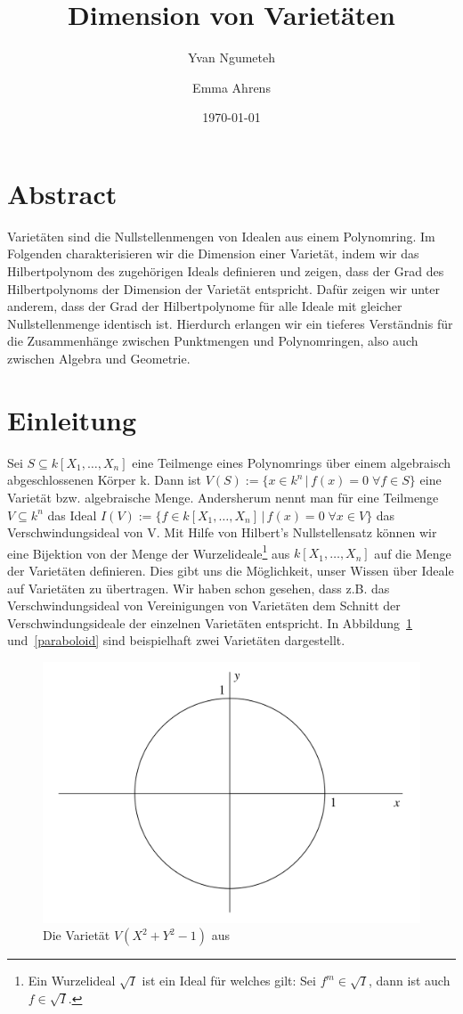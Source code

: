 \documentclass{article}
\title{Dimension von Varietäten}
\date{\today}
\author{Yvan Ngumeteh \and Emma Ahrens}
\newcommand*{\R}{k[X_{1},\ldots,X_{n}]}
\begin{document}
\maketitle

\section{Abstract}
	
	Varietäten sind die Nullstellenmengen von Idealen aus einem Polynomring. Im Folgenden 
	charakterisieren wir
	die Dimension einer Varietät, indem wir das Hilbertpolynom des zugehörigen Ideals
	definieren und zeigen, dass der Grad des Hilbertpolynoms der Dimension der Varietät entspricht.
	Dafür zeigen wir unter anderem, dass der Grad der Hilbertpolynome für alle Ideale mit 
	gleicher Nullstellenmenge identisch ist.
	Hierdurch erlangen wir ein tieferes Verständnis für die Zusammenhänge zwischen Punktmengen und
	Polynomringen, also auch zwischen Algebra und Geometrie.
	
\section{Einleitung}
	
	Sei \(S \subseteq \R\) eine Teilmenge eines Polynomrings über einem algebraisch abgeschlossenen
	Körper k. Dann ist \(V(S) := \{x \in k^n\,|\, f(x)=0\; \forall f \in S\}\) eine Varietät bzw.
	algebraische Menge. Andersherum nennt man für eine Teilmenge \(V \subseteq k^{n}\) das 
	Ideal \(I(V) := \{f \in \R\,|\, f(x)=0\; \forall x\in V\}\) das Verschwindungsideal von V.
	Mit Hilfe von Hilbert's Nullstellensatz können wir eine Bijektion von
	der Menge der Wurzelideale\footnote{Ein Wurzelideal \(\sqrt{I}\) ist ein Ideal für welches gilt: Sei \(f^{m} \in \sqrt{I}\), dann ist auch \(f \in \sqrt{I}\).} aus \(\R\) auf die Menge der Varietäten definieren. Dies gibt uns
	die Möglichkeit, unser Wissen über Ideale auf Varietäten zu übertragen. Wir haben schon
	gesehen, dass z.B. das Verschwindungsideal von Vereinigungen von Varietäten dem Schnitt der
	Verschwindungsideale der einzelnen Varietäten entspricht.
	In Abbildung~\ref{circle} und~\ref{paraboloid} sind beispielhaft zwei Varietäten dargestellt.

	\begin{figure}[ht]
		\centering
		\includegraphics[width=.75\linewidth]{circle.png}
		\caption{Die Varietät \(V(X^2 + Y^2 -1)\) aus \cite{CLOS}}
		\label{circle}
	\end{figure}
\end{document}
